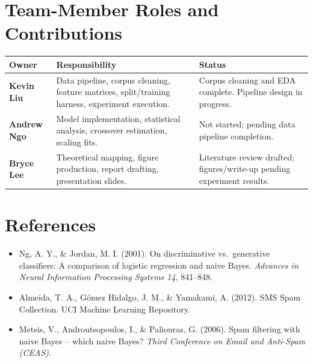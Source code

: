 \documentclass[11pt]{article}
\begin{document}
\section{Team-Member Roles and Contributions}

\begin{center}
\small
\begin{tabularx}{\textwidth}{@{}>{\raggedright\arraybackslash}p{} L L@{}}
\toprule
\textbf{Owner} & \textbf{Responsibility} & \textbf{Status} \\
\midrule
\textbf{Kevin Liu} & Data pipeline, corpus cleaning, feature matrices, split/training harness, experiment execution. & Corpus cleaning and EDA complete. Pipeline design in progress. \\
\textbf{Andrew Ngo} & Model implementation, statistical analysis, crossover estimation, scaling fits. & Not started; pending data pipeline completion. \\
\textbf{Bryce Lee} & Theoretical mapping, figure production, report drafting, presentation slides. & Literature review drafted; figures/write-up pending experiment results. \\
\bottomrule
\end{tabularx}
\end{center}

\section*{References}

\begin{itemize}[leftmargin=*, label={}]
\small
  \item Ng, A. Y., \& Jordan, M. I. (2001). On discriminative vs.\ generative classifiers: A comparison of logistic regression and naive Bayes. \textit{Advances in Neural Information Processing Systems 14}, 841--848.
  \item Almeida, T. A., G\'omez Hidalgo, J. M., \& Yamakami, A. (2012). SMS Spam Collection. UCI Machine Learning Repository.
  \item Metsis, V., Androutsopoulos, I., \& Paliouras, G. (2006). Spam filtering with naive Bayes -- which naive Bayes? \textit{Third Conference on Email and Anti-Spam (CEAS)}.
\end{itemize}
\end{document}
